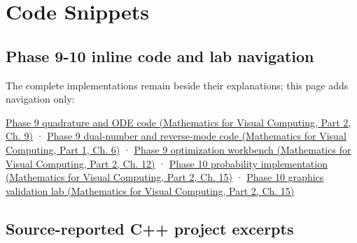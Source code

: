\hypertarget{appendix-4e2236f53445}{}\label{referencestart:appendix-4e2236f53445}
\section{Code Snippets}\label{appendix-4e2236f53445-code-snippets}

\hypertarget{appendix-4e2236f53445-code-snippets}{}

\subsection{Phase 9-10 inline code and lab navigation}\label{appendix-4e2236f53445-phase-9-10-inline-code-and-lab-navigation}

\hypertarget{appendix-4e2236f53445-phase-9-10-inline-code-and-lab-navigation}{}

The complete implementations remain beside their explanations; this page adds navigation only:

\href{../02-Mathematics-for-Visual-Computing-P02/main.pdf\#nameddest=02-foundations-ii-ch025-odes-and-numerical-simulation}{Phase 9 quadrature and ODE code (Mathematics for Visual Computing, Part 2, Ch. 9)} · \href{../02-Mathematics-for-Visual-Computing-P01/main.pdf\#nameddest=02-foundations-ii-ch022-numerical-differentiation-and-automatic-differentiation}{Phase 9 dual-number and reverse-mode code (Mathematics for Visual Computing, Part 1, Ch. 6)} · \href{../02-Mathematics-for-Visual-Computing-P02/main.pdf\#nameddest=02-foundations-ii-ch028-reliable-optimization-in-practice}{Phase 9 optimization workbench (Mathematics for Visual Computing, Part 2, Ch. 12)} · \href{../02-Mathematics-for-Visual-Computing-P02/main.pdf\#nameddest=02-foundations-ii-ch031-implement-probability-without-losing-its-numerical-contracts}{Phase 10 probability implementation (Mathematics for Visual Computing, Part 2, Ch. 15)} · \href{../02-Mathematics-for-Visual-Computing-P02/main.pdf\#nameddest=02-foundations-ii-ch031-use-probability-to-evaluate-graphics-and-research-claims}{Phase 10 graphics validation lab (Mathematics for Visual Computing, Part 2, Ch. 15)}

\subsection{Source-reported C++ project excerpts}\label{appendix-4e2236f53445-source-reported-c-project-excerpts}

\hypertarget{appendix-4e2236f53445-source-reported-c-project-excerpts}{}

